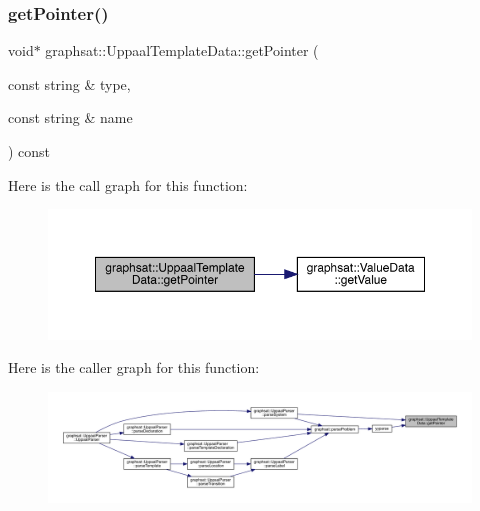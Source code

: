 \subsubsection{\texorpdfstring{getPointer()}{getPointer()}}
{\footnotesize\ttfamily void$\ast$ graphsat\+::\+Uppaal\+Template\+Data\+::get\+Pointer (\begin{DoxyParamCaption}\item[{const string \&}]{type,  }\item[{const string \&}]{name }\end{DoxyParamCaption}) const\hspace{0.3cm}{\ttfamily [inline]}}

Here is the call graph for this function\+:
\nopagebreak
\begin{figure}[H]
\begin{center}
\leavevmode
\includegraphics[width=350pt]{classgraphsat_1_1_uppaal_template_data_ae03ac08e2fac3516a81cc86bfae9b921_cgraph}
\end{center}
\end{figure}
Here is the caller graph for this function\+:
\nopagebreak
\begin{figure}[H]
\begin{center}
\leavevmode
\includegraphics[width=350pt]{classgraphsat_1_1_uppaal_template_data_ae03ac08e2fac3516a81cc86bfae9b921_icgraph}
\end{center}
\end{figure}
\mbox{\label{classgraphsat_1_1_uppaal_template_data_a30174d5936a6f73a36556310f1a30a99}} 
